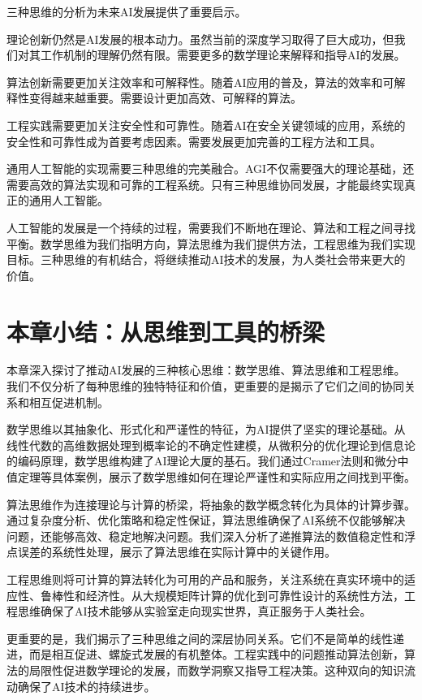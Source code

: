 三种思维的分析为未来AI发展提供了重要启示。

理论创新仍然是AI发展的根本动力。虽然当前的深度学习取得了巨大成功，但我们对其工作机制的理解仍然有限。需要更多的数学理论来解释和指导AI的发展。

算法创新需要更加关注效率和可解释性。随着AI应用的普及，算法的效率和可解释性变得越来越重要。需要设计更加高效、可解释的算法。

工程实践需要更加关注安全性和可靠性。随着AI在安全关键领域的应用，系统的安全性和可靠性成为首要考虑因素。需要发展更加完善的工程方法和工具。

通用人工智能的实现需要三种思维的完美融合。AGI不仅需要强大的理论基础，还需要高效的算法实现和可靠的工程系统。只有三种思维协同发展，才能最终实现真正的通用人工智能。

人工智能的发展是一个持续的过程，需要我们不断地在理论、算法和工程之间寻找平衡。数学思维为我们指明方向，算法思维为我们提供方法，工程思维为我们实现目标。三种思维的有机结合，将继续推动AI技术的发展，为人类社会带来更大的价值。

\section{本章小结：从思维到工具的桥梁}

本章深入探讨了推动AI发展的三种核心思维：数学思维、算法思维和工程思维。我们不仅分析了每种思维的独特特征和价值，更重要的是揭示了它们之间的协同关系和相互促进机制。

数学思维以其抽象化、形式化和严谨性的特征，为AI提供了坚实的理论基础。从线性代数的高维数据处理到概率论的不确定性建模，从微积分的优化理论到信息论的编码原理，数学思维构建了AI理论大厦的基石。我们通过Cramer法则和微分中值定理等具体案例，展示了数学思维如何在理论严谨性和实际应用之间找到平衡。

算法思维作为连接理论与计算的桥梁，将抽象的数学概念转化为具体的计算步骤。通过复杂度分析、优化策略和稳定性保证，算法思维确保了AI系统不仅能够解决问题，还能够高效、稳定地解决问题。我们深入分析了递推算法的数值稳定性和浮点误差的系统性处理，展示了算法思维在实际计算中的关键作用。

工程思维则将可计算的算法转化为可用的产品和服务，关注系统在真实环境中的适应性、鲁棒性和经济性。从大规模矩阵计算的优化到可靠性设计的系统性方法，工程思维确保了AI技术能够从实验室走向现实世界，真正服务于人类社会。

更重要的是，我们揭示了三种思维之间的深层协同关系。它们不是简单的线性递进，而是相互促进、螺旋式发展的有机整体。工程实践中的问题推动算法创新，算法的局限性促进数学理论的发展，而数学洞察又指导工程决策。这种双向的知识流动确保了AI技术的持续进步。

